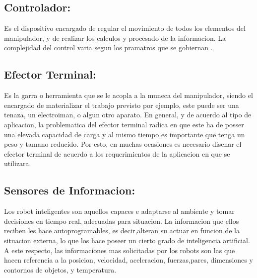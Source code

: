 \documentclass[14pt,a4paper]{article}
\begin{document}
\subsection{Controlador:}
Es el dispositivo encargado de regular el movimiento de todos los elementos del manipulador, y de realizar los calculos y procesado de la informacion. La complejidad del control varia segun los pramatros que se gobiernan \citep{cardenas2015diseno}.
\subsection{Efector Terminal:}
Es la garra o herramienta que se le acopla a la muneca del manipulador, siendo el encargado de materializar el trabajo previsto por ejemplo, este puede ser una tenaza, un electroiman, o algun otro aparato. En general, y de acuerdo al tipo de aplicacion, la problematica del efector terminal radica en que este ha de posser una elevada capacidad de carga y al mismo tiempo es importante que tenga un peso y tamano reducido. Por esto, en muchas ocasiones es necesario disenar el efector terminal de acuerdo a los requerimientos de la aplicacion en que se utilizara.
\subsection{Sensores de Informacion:}
Los robot inteligentes son aquellos capaces e adaptarse al ambiente y tomar decisiones en tiempo real, adecuadas para situacion. La informacion que ellos reciben les hace autoprogramables, es decir,alteran su actuar en funcion de la situacion externa, lo que los hace poseer un cierto grado de inteligencia artificial. A este respecto, las informaciones mas solicitadas por los robots son las que hacen referencia a la posicion, velocidad, aceleracion, fuerzas,pares, dimensiones y contornos de objetos, y temperatura.
\end{document}

